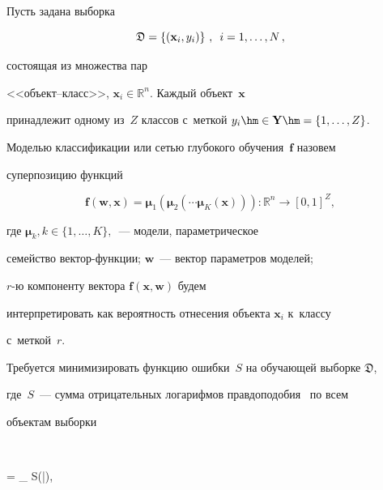 Пусть задана выборка 


\begin{equation}


\label{eq:dataset}\mathfrak{D} = 


\left\{(\mathbf{x}_i,y_i)\right\}\,, \enskip i = 1,\dots,N\,,


\end{equation} 


состоящая из множества пар 


<<объект--класс>>, $\mathbf{x}_i \in \mathbb{R}^n$. Каждый объект~$\mathbf{x}$ 


принадлежит одному из~$Z$ классов с~меткой $y_i\hm \in \mathbf{Y} \hm= \{1,\dots,Z\}$.





Моделью классификации или сетью глубокого обучения~$\mathbf{f}$ назовем 


суперпозицию функций


\begin{equation}


\label{eq:main}


 \mathbf{f}(\mathbf{w}, \mathbf{x}) = 


\boldsymbol{{\mu}}_1\left(\boldsymbol{\mu}_2(\cdots \boldsymbol{\mu}_K(\mathbf{x}))\right): 


\mathbb{R}^n \to [0,1]^Z,


\end{equation}


где $\boldsymbol{\mu}_k, k \in \{1,\dots,K\},$~--- модели, параметрическое 


семейство век\-тор-функ\-ции; $\mathbf{w}$~--- вектор параметров моделей;


$r$-ю компоненту вектора $\mathbf{f}(\mathbf{x},\mathbf{w})$ будем 


интерпретировать как вероятность отнесения объекта $\mathbf{x}_i$ к~классу 


с~меткой~$r$.





Требуется минимизировать функцию ошибки~$S$ на обучающей выборке $\mathfrak{D}$,


где~$S$~--- сумма отрицательных логарифмов правдоподобия~\cite{nnl} по всем 


объектам выборки


$$


  = _ S(|),


